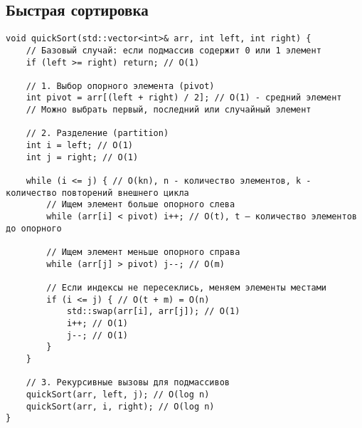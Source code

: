 \documentclass[otchet]{SCWorks}
\begin{document}
\subsection{Быстрая сортировка}
\begin{verbatim}
void quickSort(std::vector<int>& arr, int left, int right) {
    // Базовый случай: если подмассив содержит 0 или 1 элемент
    if (left >= right) return; // O(1)

    // 1. Выбор опорного элемента (pivot)
    int pivot = arr[(left + right) / 2]; // O(1) - средний элемент
    // Можно выбрать первый, последний или случайный элемент

    // 2. Разделение (partition)
    int i = left; // O(1)
    int j = right; // O(1)

    while (i <= j) { // O(kn), n - количество элементов, k - количество повторений внешнего цикла
        // Ищем элемент больше опорного слева
        while (arr[i] < pivot) i++; // O(t), t – количество элементов до опорного

        // Ищем элемент меньше опорного справа
        while (arr[j] > pivot) j--; // O(m)

        // Если индексы не пересеклись, меняем элементы местами
        if (i <= j) { // O(t + m) = O(n)
            std::swap(arr[i], arr[j]); // O(1)
            i++; // O(1)
            j--; // O(1)
        }
    }

    // 3. Рекурсивные вызовы для подмассивов
    quickSort(arr, left, j); // O(log n)
    quickSort(arr, i, right); // O(log n)
}
\end{verbatim}
\end{document}
